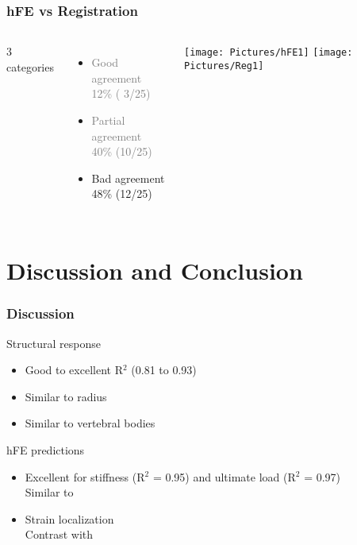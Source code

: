 \documentclass[xcolor=table,11pt]{beamer}
\begin{document}
	\begin{frame}[noframenumbering]
		\frametitle{hFE vs Registration}
		\centering
		\vspace{2mm}
		\begin{columns}
			\vfill
			3 categories\\
			\vfill
			\begin{itemize}
				\item \textcolor{gray}{Good agreement\\12\% ( 3/25)}
				\item \textcolor{gray}{Partial agreement\\40\% (10/25)}
				\item Bad agreement\\48\% (12/25)
			\end{itemize}
			\vfill

			\centering
			\texttt{[image: Pictures/hFE1]}\vspace{5mm}
			\texttt{[image: Pictures/Reg1]}
		\end{columns}
	\end{frame}

	
	\section{Discussion and Conclusion}

	\begin{frame}
		\frametitle{Discussion}

		Structural response
		\begin{itemize}
			\item Good to excellent R$^2$ (0.81 to 0.93)
			\item Similar to radius \cite{p5}\cite{p6}
			\item Similar to vertebral bodies \cite{p7}\cite{p8}
		\end{itemize}

		\vfill

		hFE predictions
		\begin{itemize}
			\item Excellent for stiffness (R$^2$ = 0.95) and ultimate load (R$^2$ = 0.97)\\Similar to \cite{p9}\cite{p10}
			\item Strain localization\\Contrast with \cite{p4}
		\end{itemize}

	\end{frame}
	
\end{document}
